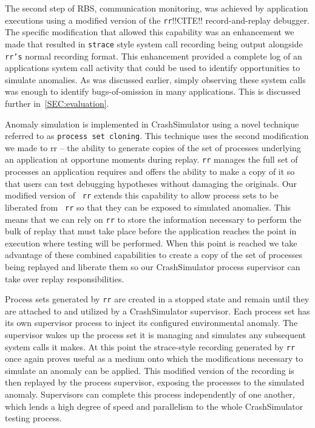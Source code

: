 The second step of RBS, communication monitoring, was achieved by
application executions using a modified version of the {\tt rr}!!CITE!!
record-and-replay debugger.  The specific modification that allowed this
capability was an enhancement we made that resulted in {\tt strace} style
system call recording being output alongside {\tt rr's} normal recording
format.
This enhancement provided
a complete log of an applications system call activity
that could be used to identify opportunities to simulate anomalies.  As was
discussed earlier, simply observing these system calls was enough to
identify bugs-of-omission in many applications.  This is discussed further
in~\ref{SEC:evaluation}.

Anomaly simulation is implemented in CrashSimulator using a novel technique
referred to as {\tt process set cloning}.  This technique uses the second
modification we made to rr -- the ability to generate copies of the set of
processes underlying an application at opportune moments during replay.
{\tt rr} manages
the full set of processes an application requires and offers the ability to
make a copy of it so that users can test debugging
hypotheses without damaging the originals.  Our modified version of {\tt
rr} extends this capability to allow process sets to be liberated from {\tt
rr} so that they can be exposed to simulated anomalies.
This means that we can rely on {\tt rr}
to store the information necessary to perform the bulk of
replay that must take place before the application reaches the point in
execution where testing will be performed.  When this point is reached we
take advantage of these combined capabilities
to create a
copy of the set of processes being replayed and liberate them so our
CrashSimulator process supervisor can take over replay responsibilities.

Process sets generated by {\tt rr} are created in a stopped state and
remain until they are attached to and utilized by a CrashSimulator
supervisor.  Each process set has its own supervisor process to inject
its configured environmental anomaly.  The
supervisor wakes up the process set it is managing and simulates any
subsequent system calls it makes.
At this point the strace-style recording generated by {\tt rr} once again
proves useful as a medium onto which the modifications necessary to
simulate an anomaly can be applied.  This modified version of the recording
is then replayed by the process supervisor, exposing the processes to the
simulated anomaly.
Supervisors can complete this
process independently of one another, which lends a
high degree of speed and
parallelism to the whole CrashSimulator testing process.

